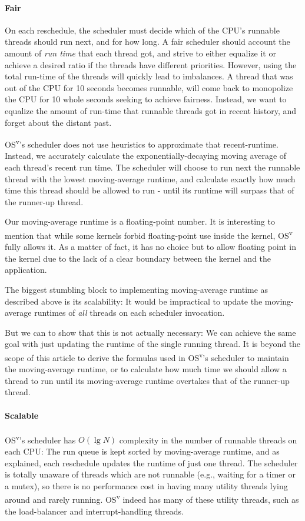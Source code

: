 \documentclass{sig-alternate}
\begin{document}
\paragraph{Fair}
\label{par:fair}
On each reschedule, the scheduler must decide which of the CPU's runnable
threads should run next, and for how long. A fair scheduler
should account the amount of \emph{run time} that each thread got, and
strive to either equalize it or achieve a desired ratio if the threads have
different priorities. However, using the total run-time of the threads
will quickly lead to imbalances. A thread that was out of the CPU for 10 seconds
becomes runnable, will come back to monopolize the CPU
for 10 whole seconds seeking to achieve fairness. Instead, we want to
equalize the amount of run-time that runnable threads got in recent
history, and forget about the distant past.

OS\textsuperscript{v}'s scheduler does not use heuristics
to approximate that recent-runtime. Instead, we accurately calculate
the exponentially-decaying moving average of each thread's recent
run time. The scheduler will choose to run next
the runnable thread with the lowest moving-average runtime, and calculate
exactly how much time this thread should be allowed to run - until its
runtime will surpass that of the runner-up thread.

Our moving-average runtime is a floating-point number. It is interesting
to mention that while some kernels forbid floating-point use inside the
kernel, OS\textsuperscript{v} fully allows it. As a matter of fact, it has no choice but to allow floating
point in the kernel due to the lack of a clear boundary between
the kernel and the application.

The biggest stumbling block to implementing moving-average runtime as
described above is its scalability: It would be impractical to update the
moving-average runtimes of \emph{all} threads on each scheduler invocation.

But we can to show that this is not actually necessary:
We can achieve the same goal with just updating the runtime of the
single running thread. It is beyond the scope of this
article to derive the formulas used in OS\textsuperscript{v}'s scheduler to maintain the
moving-average runtime, or to calculate how much time we should allow
a thread to run until its moving-average runtime overtakes that of the
runner-up thread.


\paragraph{Scalable}
OS\textsuperscript{v}'s scheduler has $O(\lg N)$ complexity in the number of runnable
threads on each CPU: The run queue is kept sorted by moving-average
runtime, and as explained, each reschedule updates the
runtime of just one thread. The scheduler is totally unaware of threads
which are not runnable (e.g., waiting for a timer or a mutex), so there
is no performance cost in having many utility threads lying around and rarely running. OS\textsuperscript{v}
indeed has many of these utility threads, such as the load-balancer and interrupt-handling threads.
\end{document}
